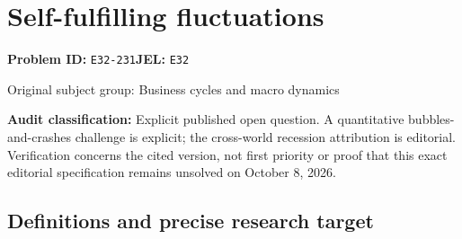 \documentclass[11pt,a4paper]{article}
\begin{document}
\section*{Self-fulfilling fluctuations}
\textbf{Problem ID:} \texttt{E32-231}\quad \textbf{JEL:} \texttt{E32}\par
\label{problem:OP-0235}
{\sffamily\small\color{muted}Original subject group: Business cycles and macro dynamics\par}
\label{definitions:problem:30007516}
\textbf{Audit classification:} Explicit published open question. A quantitative bubbles-and-crashes challenge is explicit; the cross-world recession attribution is editorial. Verification concerns the cited version, not first priority or proof that this exact editorial specification remains unsolved on October 8, 2026.
\subsection*{Definitions and precise research target}
\end{document}
